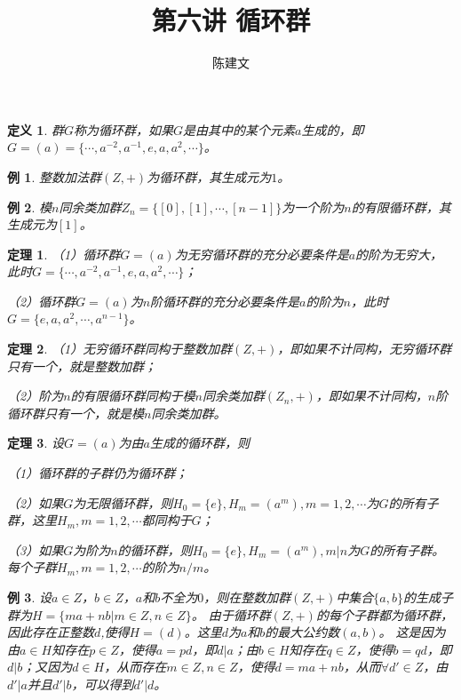 \documentclass{article}
\newtheorem{Def}{定义}
\newtheorem{Thm}{定理}
\newtheorem*{Example}{例}
\begin{document}
\begin{CJK*}{UTF8}{gbsn}
  \title{第六讲 循环群}
  \author{陈建文}
  \maketitle
  
\begin{Def}
  群$G$称为循环群，如果$G$是由其中的某个元素$a$生成的，即$G=(a)=\{\cdots,a^{-2},a^{-1},e,a,a^2,\cdots\}$。
\end{Def}

\begin{Example}
  整数加法群$(Z,+)$为循环群，其生成元为$1$。
\end{Example}

\begin{Example}
  模$n$同余类加群$Z_n=\{[0],[1],\cdots,[n-1]\}$为一个阶为$n$的有限循环群，其生成元为$[1]$。
\end{Example}

\begin{Thm}
  （1）循环群$G=(a)$为无穷循环群的充分必要条件是$a$的阶为无穷大，此时$G=\{\cdots,a^{-2},a^{-1},e,a,a^2,\cdots\}$；
  
  （2）循环群$G=(a)$为$n$阶循环群的充分必要条件是$a$的阶为$n$，此时$G=\{e,a,a^2,\cdots,a^{n-1}\}$。
\end{Thm}

\begin{Thm}
  （1）无穷循环群同构于整数加群$(Z,+)$，即如果不计同构，无穷循环群只有一个，就是整数加群；
  
  （2）阶为$n$的有限循环群同构于模$n$同余类加群$(Z_n,+)$，即如果不计同构，$n$阶循环群只有一个，就是模$n$同余类加群。
\end{Thm}

\begin{Thm}
  设$G=(a)$为由$a$生成的循环群，则

  （1）循环群的子群仍为循环群；

  （2）如果$G$为无限循环群，则$H_0=\{e\},H_m=(a^m),m=1,2,\cdots$为$G$的所有子群，这里$H_m,m=1,2,\cdots$都同构于$G$；

  （3）如果$G$为阶为$n$的循环群，则$H_0=\{e\},H_m=(a^m),m|n$为$G$的所有子群。每个子群$H_m,m=1,2,\cdots$的阶为$n/m$。
\end{Thm}

\begin{Example}
  设$a\in Z$，$b\in Z$，$a$和$b$不全为$0$，则在整数加群$(Z,+)$中集合$\{a,b\}$的生成子群为$H=\{ma+nb|m\in Z,n\in Z\}$。
  由于循环群$(Z,+)$的每个子群都为循环群，因此存在正整数$d$,使得$H=(d)$。这里$d$为$a$和$b$的最大公约数$(a,b)$。
  这是因为由$a\in H$知存在$p\in Z$，使得$a=pd$，即$d|a$；由$b\in H$知存在$q\in Z$，使得$b=qd$，即$d|b$；又因为$d\in H$，从而存在$m\in Z,n\in Z$，使得$d=ma+nb$，从而$\forall d'\in Z$，由$d'|a$并且$d'|b$，可以得到$d'|d$。
\end{Example}


\end{CJK*}
\end{document}
